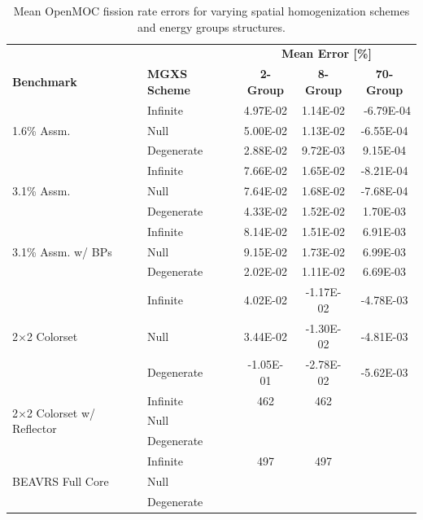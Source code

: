 \begin{table}[h!]
  \centering
  \caption[Mean OpenMOC fission rate errors]{Mean OpenMOC fission rate errors for varying spatial homogenization schemes and energy groups structures.}
  \small
  \label{table:chap8-openmoc-mean-fiss-rates}
  \vspace{6pt}
  \begin{tabular}{l l c c c}
  \toprule
  \rowcolor{lightgray}
  & & \multicolumn{3}{c}{\cellcolor{lightgray} \textbf{Mean Error [\%]}} \\
  \multirow{-2}{*}{\cellcolor{lightgray} \bf Benchmark} &
  \multirow{-2}{*}{\cellcolor{lightgray} \bf \ac{MGXS} Scheme} &
  {\cellcolor{lightgray} \bf 2-Group} &
  {\cellcolor{lightgray} \bf 8-Group} &
  {\cellcolor{lightgray} \bf 70-Group} \\
  \midrule
\multirow{3}{*}{\parbox{2.5cm}{1.6\% Assm.}} & Infinite & 4.97E-02 & 1.14E-02 &\
 -6.79E-04 \\
& Null & 5.00E-02 & 1.13E-02 & -6.55E-04 \\
& Degenerate & 2.88E-02 & 9.72E-03 & 9.15E-04 \\
  \midrule
\multirow{3}{*}{\parbox{2.5cm}{3.1\% Assm.}} & Infinite & 7.66E-02 & 1.65E-02 & -8.21E-04 \\
& Null & 7.64E-02 & 1.68E-02 & -7.68E-04 \\
& Degenerate & 4.33E-02 & 1.52E-02 & 1.70E-03 \\
  \midrule
\multirow{3}{*}{\parbox{2.5cm}{3.1\% Assm. w/ \acp{BP}}} & Infinite & 8.14E-02 & 1.51E-02 & 6.91E-03 \\
& Null & 9.15E-02 & 1.73E-02 & 6.99E-03 \\
& Degenerate & 2.02E-02 & 1.11E-02 & 6.69E-03 \\
  \midrule
  \multirow{3}{*}{\parbox{2.5cm}{2$\times$2 Colorset}} & Infinite & 4.02E-02 & -1.17E-02 & -4.78E-03 \\
& Null & 3.44E-02 & -1.30E-02 & -4.81E-03 \\
& Degenerate & -1.05E-01 & -2.78E-02 & -5.62E-03 \\
  \midrule
  \multirow{3}{*}{\parbox{2.3cm}{2$\times$2 Colorset w/ Reflector}} & Infinite & 462 & 462 & \\
  & Null & & & \\
  & Degenerate & & & \\
  \midrule
  \multirow{3}{*}{\parbox{2cm}{\ac{BEAVRS} Full Core}} & Infinite & 497 & 497 & \\
  & Null & & & \\
  & Degenerate & & & \\
  \bottomrule
\end{tabular}
\end{table}

